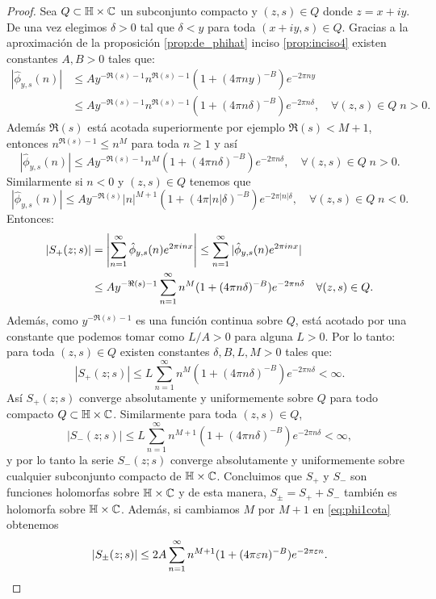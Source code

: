 \begin{proof}
  Sea $Q\subset\mathbb{H}\times\mathbb{C}$ un subconjunto compacto y $(z,s)\in Q$ donde $z=x+iy$.
  De una vez elegimos $\delta>0$ tal que $\delta<y$ para toda $(x+iy,s)\in Q$.
  Gracias a la aproximaci\'on de la proposici\'on \ref{prop:de_phihat} inciso
  \ref{prop:inciso4} existen constantes $A,B>0$ tales que:
  \begin{align*}
    |\hat{\phi}_{y,s}(n)|
    &\leq A y^{-\Re(s)-1}n^{\Re(s)-1}(1+(4\pi ny)^{-B})e^{-2\pi ny}\\
    &\leq A y^{-\Re(s)-1}n^{\Re(s)-1}(1+(4\pi n\delta)^{-B})e^{-2\pi n\delta},
      \quad\forall(z,s)\in Q\; n>0.
  \end{align*}
  Adem\'as $\Re(s)$ est\'a acotada superiormente por ejemplo $\Re(s)<M+1$, entonces
  $n^{\Re(s)-1}\leq n^M$ para toda $n\geq1$ y as\'i
  \begin{equation}\label{eq:phihataprox1}
    |\hat{\phi}_{y,s}(n)|\leq A y^{-\Re(s)-1}n^M(1+(4\pi n\delta)^{-B})e^{-2\pi n\delta},
    \quad\forall(z,s)\in Q\; n>0.
  \end{equation}
  Similarmente si $n<0$ y $(z,s)\in Q$ tenemos que
  \begin{equation}\label{eq:phihataprox2}
    |\hat{\phi}_{y,s}(n)|\leq A y^{-\Re(s)}|n|^{M+1}(1+(4\pi|n|\delta)^{-B})e^{-2\pi|n|\delta},
    \quad\forall(z,s)\in Q\; n<0.
  \end{equation}
  Entonces:
  \begin{align*}
    |S_+(z;s)|
    &=\left| \sum_{n=1}^{\infty}\hat{\phi}_{y,s}(n)e^{2\pi i n x} \right|
    \leq\sum_{n=1}^{\infty}|\hat{\phi}_{y,s}(n)e^{2\pi i n x}|\\
    &\leq A y^{-\Re(s)-1}\sum_{n=1}^{\infty}n^M(1+(4\pi n\delta)^{-B})e^{-2\pi n\delta}
      \quad\forall (z,s)\in Q.
  \end{align*}
  Adem\'as, como $y^{-\Re(s)-1}$ es una funci\'on continua sobre $Q$,
  est\'a acotado por una constante que podemos tomar como $L/A>0$ para alguna $L>0$.
  Por lo tanto: para toda $(z,s)\in Q$ existen constantes $\delta,B,L,M>0$ tales que:
  \begin{equation}\label{eq:phi1cota}
    |S_+(z;s)|\leq L\sum_{n=1}^{\infty}n^M(1+(4\pi n\delta)^{-B})e^{-2\pi n\delta}<\infty.
  \end{equation}
  As\'i $S_+(z;s)$ converge absolutamente y uniformemente sobre $Q$ para todo
  compacto $Q\subset\mathbb{H}\times\mathbb{C}$. Similarmente para toda $(z,s)\in Q$,
  \[
    |S_-(z;s)|\leq L\sum_{n=1}^{\infty}n^{M+1}(1+(4\pi n\delta)^{-B})e^{-2\pi n\delta}<\infty,
  \]
  y por lo tanto la serie $S_-(z;s)$ converge absolutamente y uniformemente sobre
  cualquier subconjunto compacto de $\mathbb{H}\times\mathbb{C}$.
  Concluimos que $S_+$ y $S_-$ son funciones holomorfas sobre $\mathbb{H}\times\mathbb{C}$ y
  de esta manera, $S_{\pm}=S_++S_-$ tambi\'en es holomorfa sobre $\mathbb{H}\times\mathbb{C}$.
  Adem\'as, si cambiamos $M$ por $M+1$ en \eqref{eq:phi1cota} obtenemos
  \begin{equation}
    \label{eq:approxPhi}
    |S_{\pm}(z;s)|\leq 2A\sum_{n=1}^{\infty}n^{M+1}(1+(4\pi\varepsilon n)^{-B})e^{-2\pi\varepsilon n}.
  \end{equation}


\end{proof}
